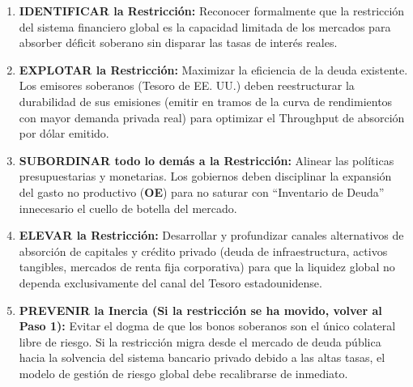 \documentclass[12pt,letterpaper]{article}
\providecommand{\tightlist}{%
  \setlength{\itemsep}{0pt}\setlength{\parskip}{0pt}}
\begin{document}
\begin{enumerate}
\def\labelenumi{\arabic{enumi}.}
\tightlist
\item
  \textbf{IDENTIFICAR la Restricción:} Reconocer formalmente que la
  restricción del sistema financiero global es la capacidad limitada de
  los mercados para absorber déficit soberano sin disparar las tasas de
  interés reales.
\item
  \textbf{EXPLOTAR la Restricción:} Maximizar la eficiencia de la deuda
  existente. Los emisores soberanos (Tesoro de EE. UU.) deben
  reestructurar la durabilidad de sus emisiones (emitir en tramos de la
  curva de rendimientos con mayor demanda privada real) para optimizar
  el Throughput de absorción por dólar emitido.
\item
  \textbf{SUBORDINAR todo lo demás a la Restricción:} Alinear las
  políticas presupuestarias y monetarias. Los gobiernos deben
  disciplinar la expansión del gasto no productivo (\textbf{OE}) para no
  saturar con ``Inventario de Deuda'' innecesario el cuello de botella
  del mercado.
\item
  \textbf{ELEVAR la Restricción:} Desarrollar y profundizar canales
  alternativos de absorción de capitales y crédito privado (deuda de
  infraestructura, activos tangibles, mercados de renta fija
  corporativa) para que la liquidez global no dependa exclusivamente del
  canal del Tesoro estadounidense.
\item
  \textbf{PREVENIR la Inercia (Si la restricción se ha movido, volver al
  Paso 1):} Evitar el dogma de que los bonos soberanos son el único
  colateral libre de riesgo. Si la restricción migra desde el mercado de
  deuda pública hacia la solvencia del sistema bancario privado debido a
  las altas tasas, el modelo de gestión de riesgo global debe
  recalibrarse de inmediato.
\end{enumerate}
\end{document}
